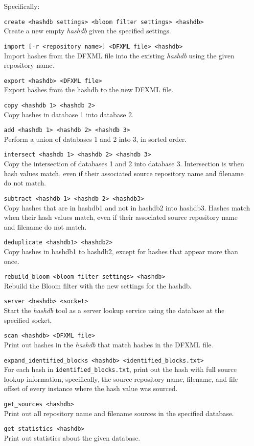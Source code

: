 \documentclass[12pt,twoside]{article}
\newcommand{\hdb}{\emph{hashdb}\xspace}
\begin{document}
Specifically:
\begin{compactitem}
\item \texttt{create <hashdb settings> <bloom filter settings> <hashdb>} \\
Create a new empty \hdb given the specified settings.
\item \texttt{import [-r <repository name>] <DFXML file> <hashdb>} \\
Import hashes from the DFXML file into the existing \hdb
using the given repository name.
\item \texttt{export <hashdb> <DFXML file>} \\
Export hashes from the hashdb to the new DFXML file.
\item \texttt{copy <hashdb 1> <hashdb 2>} \\
Copy hashes in database 1 into database 2.
\item \texttt{add <hashdb 1> <hashdb 2> <hashdb 3>} \\
Perform a union of databases 1 and 2 into 3, in sorted order.
\item \texttt{intersect <hashdb 1> <hashdb 2> <hashdb 3>} \\
Copy the intersection of databases 1 and 2 into database 3.
Intersection is when hash values match, even if their associated source
repository name and filename do not match.
\item \texttt{subtract <hashdb 1> <hashdb 2> <hashdb3>} \\
Copy hashes that are in hashdb1 and not in hashdb2 into hashdb3.
Hashes match when their hash values match, even if their associated source
repository name and filename do not match.
\item \texttt{deduplicate <hashdb1> <hashdb2>} \\
Copy hashes in hashdb1 to hashdb2,
except for hashes that appear more than once.
\item \texttt{rebuild\_bloom <bloom filter settings> <hashdb>} \\
Rebuild the Bloom filter with the new settings for the hashdb.
\item \texttt{server <hashdb> <socket>} \\
Start the \hdb tool as a server lookup service using the database
at the specified socket.
\item \texttt{scan <hashdb> <DFXML file>} \\
Print out hashes in the \hdb that match hashes in the DFXML file.
\item \texttt{expand\_identified\_blocks <hashdb> <identified\_blocks.txt>} \\
For each hash in \texttt{identified\_blocks.txt},
print out the hash with full source lookup information,
specifically, the source repository name, filename, and file offset
of every instance where the hash value was sourced.
\item \texttt{get\_sources <hashdb>} \\
Print out all repository name and filename sources in the specified database.
\item \texttt{get\_statistics <hashdb>} \\
Print out statistics about the given database.
\end{compactitem}
\end{document}
